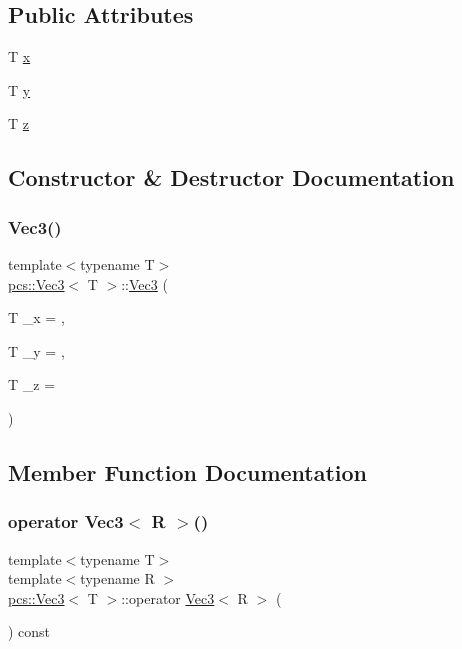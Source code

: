\subsection*{Public Attributes}
\begin{DoxyCompactItemize}
\item 
T \hyperlink{structpcs_1_1Vec3_af2913616acb265b9bb0fdb398b6cd8bb}{x}
\item 
T \hyperlink{structpcs_1_1Vec3_a1b7b628b32cee6a44ed1954af1acabf8}{y}
\item 
T \hyperlink{structpcs_1_1Vec3_a957b418609c5a11a4bb21e6a8f0381b4}{z}
\end{DoxyCompactItemize}


\subsection{Constructor \& Destructor Documentation}
\mbox{\label{structpcs_1_1Vec3_ae8bc40864aac5444a66d0b12fe0f3d03}} 
\subsubsection{\texorpdfstring{Vec3()}{Vec3()}}
{\footnotesize\ttfamily template$<$typename T$>$ \\
\hyperlink{structpcs_1_1Vec3}{pcs\+::\+Vec3}$<$ T $>$\+::\hyperlink{structpcs_1_1Vec3}{Vec3} (\begin{DoxyParamCaption}\item[{T}]{\+\_\+x = {},  }\item[{T}]{\+\_\+y = {},  }\item[{T}]{\+\_\+z = {} }\end{DoxyParamCaption})\hspace{0.3cm}{\ttfamily [inline]}}



\subsection{Member Function Documentation}
\mbox{\label{structpcs_1_1Vec3_ad42682971eb00c5cd4ec7309b85511ea}} 
\subsubsection{\texorpdfstring{operator Vec3$<$ R $>$()}{operator Vec3< R >()}}
{\footnotesize\ttfamily template$<$typename T$>$ \\
template$<$typename R $>$ \\
\hyperlink{structpcs_1_1Vec3}{pcs\+::\+Vec3}$<$ T $>$\+::operator \hyperlink{structpcs_1_1Vec3}{Vec3}$<$ R $>$ (\begin{DoxyParamCaption}{ }\end{DoxyParamCaption}) const\hspace{0.3cm}{\ttfamily [inline]}}

